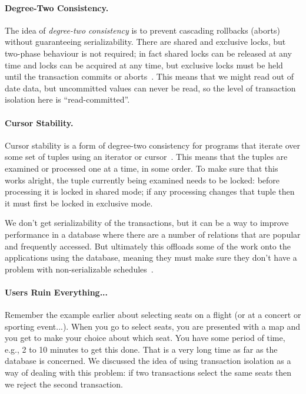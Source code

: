 \documentclass[a4paper]{report}
\begin{document}
\paragraph{Degree-Two Consistency.}
The idea of \textit{degree-two consistency} is to prevent cascading rollbacks (aborts) without guaranteeing serializability. There are shared and exclusive locks, but two-phase behaviour is not required; in fact shared locks can be released at any time and locks can be acquired at any time, but exclusive locks must be held until the transaction commits or aborts~\cite{dsc}. This means that we might read out of date data, but uncommitted values can never be read, so the level of transaction isolation here is ``read-committed''.

\paragraph{Cursor Stability.} Cursor stability is a form of degree-two consistency for programs that iterate over some set of tuples using an iterator or cursor~\cite{dsc}. This means that the tuples are examined or processed one at a time, in some order. To make sure that this works alright, the tuple currently being examined needs to be locked: before processing it is locked in shared mode; if any processing changes that tuple then it must first be locked in exclusive mode. 

We don't get serializability of the transactions, but it can be a way to improve performance in a database where there are a number of relations that are popular and frequently accessed. But ultimately this offloads some of the work onto the applications using the database, meaning they must make sure they don't have a problem with non-serializable schedules~\cite{dsc}.

\paragraph{Users Ruin Everything...}
Remember the example earlier about selecting seats on a flight (or at a concert or sporting event...). When you go to select seats, you are presented with a map and you get to make your choice about which seat. You have some period of time, e.g., 2 to 10 minutes to get this done. That is a very long time as far as the database is concerned. We discussed the idea of using transaction isolation as a way of dealing with this problem: if two transactions select the same seats then we reject the second transaction.
\end{document}
